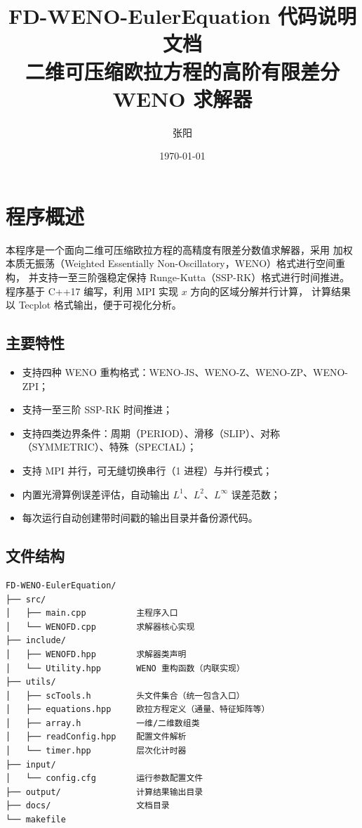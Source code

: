 \documentclass{article}
\title{\textbf{FD-WENO-EulerEquation 代码说明文档}\\
\large 二维可压缩欧拉方程的高阶有限差分 WENO 求解器}
\date{\today}
\author{张阳}
\numberwithin{equation}{section}
\begin{document}
\maketitle
\tableofcontents
\newpage

\section{程序概述}

本程序是一个面向二维可压缩欧拉方程的高精度有限差分数值求解器，采用
加权本质无振荡（Weighted Essentially Non-Oscillatory，WENO）格式进行空间重构，
并支持一至三阶强稳定保持 Runge-Kutta（SSP-RK）格式进行时间推进。
程序基于 C++17 编写，利用 MPI 实现 $x$ 方向的区域分解并行计算，
计算结果以 Tecplot 格式输出，便于可视化分析。

\subsection{主要特性}

\begin{itemize}
    \item 支持四种 WENO 重构格式：WENO-JS、WENO-Z、WENO-ZP、WENO-ZPI；
    \item 支持一至三阶 SSP-RK 时间推进；
    \item 支持四类边界条件：周期（PERIOD）、滑移（SLIP）、对称（SYMMETRIC）、特殊（SPECIAL）；
    \item 支持 MPI 并行，可无缝切换串行（1 进程）与并行模式；
    \item 内置光滑算例误差评估，自动输出 $L^1$、$L^2$、$L^\infty$ 误差范数；
    \item 每次运行自动创建带时间戳的输出目录并备份源代码。
\end{itemize}

\subsection{文件结构}

\begin{verbatim}
FD-WENO-EulerEquation/
├── src/
│   ├── main.cpp          主程序入口
│   └── WENOFD.cpp        求解器核心实现
├── include/
│   ├── WENOFD.hpp        求解器类声明
│   └── Utility.hpp       WENO 重构函数（内联实现）
├── utils/
│   ├── scTools.h         头文件集合（统一包含入口）
│   ├── equations.hpp     欧拉方程定义（通量、特征矩阵等）
│   ├── array.h           一维/二维数组类
│   ├── readConfig.hpp    配置文件解析
│   └── timer.hpp         层次化计时器
├── input/
│   └── config.cfg        运行参数配置文件
├── output/               计算结果输出目录
├── docs/                 文档目录
└── makefile
\end{verbatim}
\end{document}
